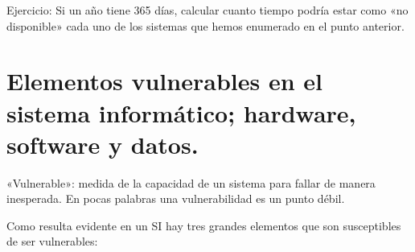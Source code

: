 \documentclass[letterpaper,10pt,spanish]{sphinxmanual}
\begin{document}
Ejercicio: Si un año tiene 365 días, calcular cuanto tiempo podría estar como «no disponible» cada uno de los sistemas que hemos enumerado en el punto anterior.


\section{Elementos vulnerables en el sistema informático; hardware, software y datos.}
\label{\detokenize{tema_pautas_seguridad_informatica/tema_pautas_seguridad_informatica:elementos-vulnerables-en-el-sistema-informatico-hardware-software-y-datos}}
«Vulnerable»: medida de la capacidad de un sistema para fallar de manera inesperada. En pocas palabras una vulnerabilidad es un punto débil.

Como resulta evidente en un SI hay tres grandes elementos que son susceptibles de ser vulnerables:
\end{document}
